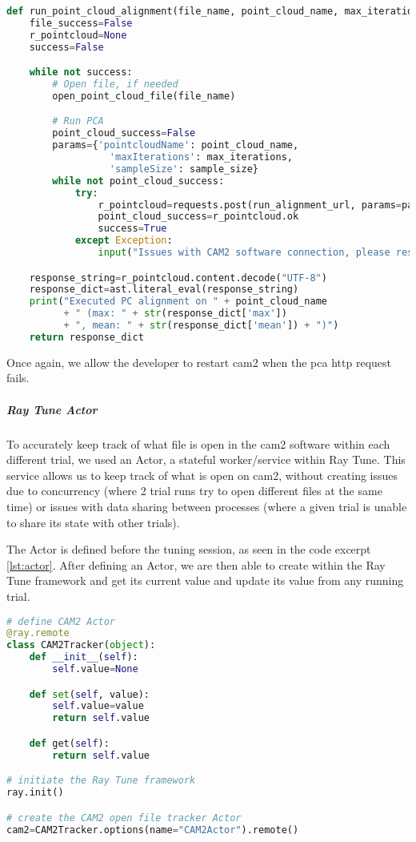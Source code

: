 \begin{lstlisting}[language=Python, caption=Running \acrshort{pca} function in \acrshort{cam2}, captionpos=b, label={lst:cam2_file}]
def run_point_cloud_alignment(file_name, point_cloud_name, max_iterations, sample_size):
    file_success=False
    r_pointcloud=None
    success=False

    while not success:
        # Open file, if needed
        open_point_cloud_file(file_name)

        # Run PCA
        point_cloud_success=False
        params={'pointcloudName': point_cloud_name,
                  'maxIterations': max_iterations,
                  'sampleSize': sample_size}
        while not point_cloud_success:
            try:
                r_pointcloud=requests.post(run_alignment_url, params=params)
                point_cloud_success=r_pointcloud.ok
                success=True
            except Exception:
                input("Issues with CAM2 software connection, please restart the CAM2 software.")

    response_string=r_pointcloud.content.decode("UTF-8")
    response_dict=ast.literal_eval(response_string)
    print("Executed PC alignment on " + point_cloud_name
          + " (max: " + str(response_dict['max'])
          + ", mean: " + str(response_dict['mean']) + ")")
    return response_dict
\end{lstlisting}

Once again, we allow the developer to restart \acrshort{cam2} when the \acrshort{pca} \acrshort{http} request fails.

\subparagraph{Ray Tune Actor}

To accurately keep track of what file is open in the \acrshort{cam2} software within each different trial, we used an Actor, a stateful worker/service within Ray Tune. This service allows us to keep track of what is open on \acrshort{cam2}, without creating issues due to concurrency (where 2 trial runs try to open different files at the same time) or issues with data sharing between processes (where a given trial is unable to share its state with other trials). 

The Actor is defined before the tuning session, as seen in the code excerpt \ref{lst:actor}. After defining an Actor, we are then able to create within the Ray Tune framework and get its current value and update its value from any running trial.

\newpage

\begin{lstlisting}[language=Python, caption=Initiating a Ray Tune Actor, captionpos=b, label={lst:actor}]
# define CAM2 Actor
@ray.remote
class CAM2Tracker(object):
    def __init__(self):
        self.value=None

    def set(self, value):
        self.value=value
        return self.value

    def get(self):
        return self.value

# initiate the Ray Tune framework
ray.init()

# create the CAM2 open file tracker Actor
cam2=CAM2Tracker.options(name="CAM2Actor").remote()
\end{lstlisting}


